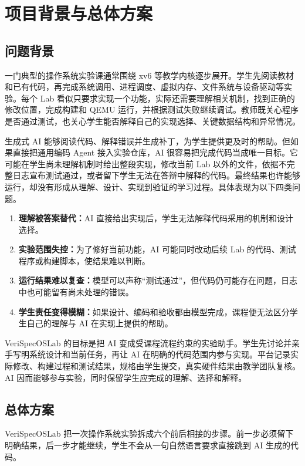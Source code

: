 \chapter{项目背景与总体方案}

\section{问题背景}

一门典型的操作系统实验课通常围绕 xv6 等教学内核逐步展开。学生先阅读教材和已有代码，再完成系统调用、进程调度、虚拟内存、文件系统与设备驱动等实验。每个 Lab 看似只要求实现一个功能，实际还需要理解相关机制，找到正确的修改位置，完成构建和 QEMU 运行，并根据测试失败继续调试。教师既关心程序是否通过测试，也关心学生能否解释自己的实现选择、关键数据结构和异常情况。

生成式 AI 能够阅读代码、解释错误并生成补丁，为学生提供更及时的帮助。但如果直接把通用编码 Agent 接入实验仓库，AI 很容易把完成代码当成唯一目标。它可能在学生尚未理解机制时给出整段实现，修改当前 Lab 以外的文件，依据不完整日志宣布测试通过，或者留下学生无法在答辩中解释的代码。最终结果也许能够运行，却没有形成从理解、设计、实现到验证的学习过程。具体表现为以下四类问题。

\begin{enumerate}
  \item \textbf{理解被答案替代：}AI 直接给出实现后，学生无法解释代码采用的机制和设计选择。
  \item \textbf{实验范围失控：}为了修好当前功能，AI 可能同时改动后续 Lab 的代码、测试程序或构建脚本，使结果难以判断。
  \item \textbf{运行结果难以复查：}模型可以声称``测试通过''，但代码仍可能存在问题，日志中也可能留有尚未处理的错误。
  \item \textbf{学生责任变得模糊：}如果设计、编码和验收都由模型完成，课程便无法区分学生自己的理解与 AI 在实现上提供的帮助。
\end{enumerate}

VeriSpecOSLab 的目标是把 AI 变成受课程流程约束的实验助手。学生先讨论并亲手写明系统设计和当前任务，再让 AI 在明确的代码范围内参与实现。平台记录实际修改、构建过程和测试结果，规格由学生提交，真实硬件结果由教学团队复核。AI 因而能够参与实验，同时保留学生应完成的理解、选择和解释。

\section{总体方案}

VeriSpecOSLab 把一次操作系统实验拆成六个前后相接的步骤。前一步必须留下明确结果，后一步才能继续，学生不会从一句自然语言要求直接跳到 AI 生成的代码。

